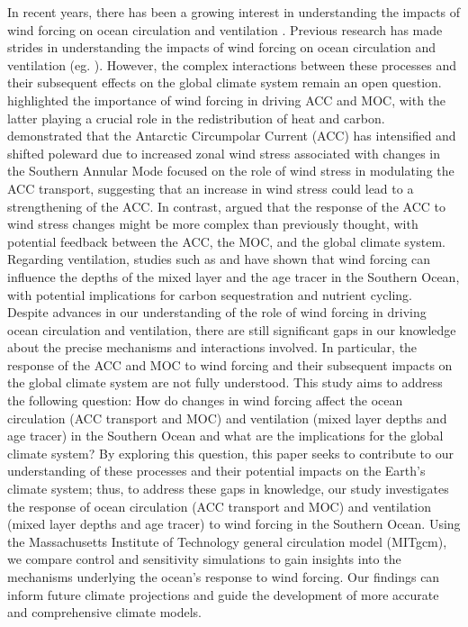 \documentclass[12pt]{article}
\begin{document}
\noindent In recent years, there has been a growing interest in understanding the impacts of wind forcing on ocean circulation and ventilation \citep{meredith2006circumpolar,spence2014rapid}. Previous research has made strides in understanding the impacts of wind forcing on ocean circulation and ventilation (eg. \citealp{marshall2012closure,farneti2015assessment,morrison2015upwelling,boning2008response}). However, the complex interactions between these processes and their subsequent effects on the global climate system remain an open question. \cite{marshall2012closure} highlighted the importance of wind forcing in driving ACC and MOC, with the latter playing a crucial role in the redistribution of heat and carbon. \citep{boning2008response} demonstrated that the Antarctic Circumpolar Current (ACC) has intensified and shifted poleward due to increased zonal wind stress associated with changes in the Southern Annular Mode\cite{farneti2015assessment} focused on the role of wind stress in modulating the ACC transport, suggesting that an increase in wind stress could lead to a strengthening of the ACC. In contrast, \cite{morrison2015upwelling} argued that the response of the ACC to wind stress changes might be more complex than previously thought, with potential feedback between the ACC, the MOC, and the global climate system. Regarding ventilation, studies such as \cite{sallee2013assessment}  and \cite{downes2011impacts} have shown that wind forcing can influence the depths of the mixed layer and the age tracer in the Southern Ocean, with potential implications for carbon sequestration and nutrient cycling. \\
 
 
\noindent Despite advances in our understanding of the role of wind forcing in driving ocean circulation and ventilation, there are still significant gaps in our knowledge about the precise mechanisms and interactions involved. In particular, the response of the ACC and MOC to wind forcing and their subsequent impacts on the global climate system are not fully understood. 
This study aims to address the following question: How do changes in wind forcing affect the ocean circulation (ACC transport and MOC) and ventilation (mixed layer depths and age tracer) in the Southern Ocean and what are the implications for the global climate system?  By exploring this question, this paper seeks to contribute to our understanding of these processes and their potential impacts on the Earth's climate system; thus, to address these gaps in knowledge, our study investigates the response of ocean circulation (ACC transport and MOC) and ventilation (mixed layer depths and age tracer) to wind forcing in the Southern Ocean. Using the Massachusetts Institute of Technology general circulation model (MITgcm), we compare control and sensitivity simulations to gain insights into the mechanisms underlying the ocean's response to wind forcing. Our findings can inform future climate projections and guide the development of more accurate and comprehensive climate models.\\
\end{document}
